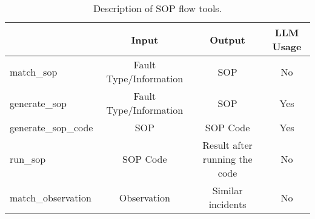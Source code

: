 
\begin{table*}
\centering
\caption{Description of SOP flow tools.}
\label{tab:frameworktool}
\small
\begin{tabular}{lccc} 
\toprule
                    & Input                   & Output                        & LLM Usage  \\ 
\midrule
match\_sop          & Fault Type/Information & SOP                           & No         \\
generate\_sop       & Fault Type/Information & SOP                           & Yes        \\
generate\_sop\_code & SOP                     & SOP Code                      & Yes        \\
run\_sop            & SOP Code                & Result after running the code & No         \\
match\_observation  & Observation             & Similar incidents             & No         \\
\bottomrule
\end{tabular}
\end{table*}


